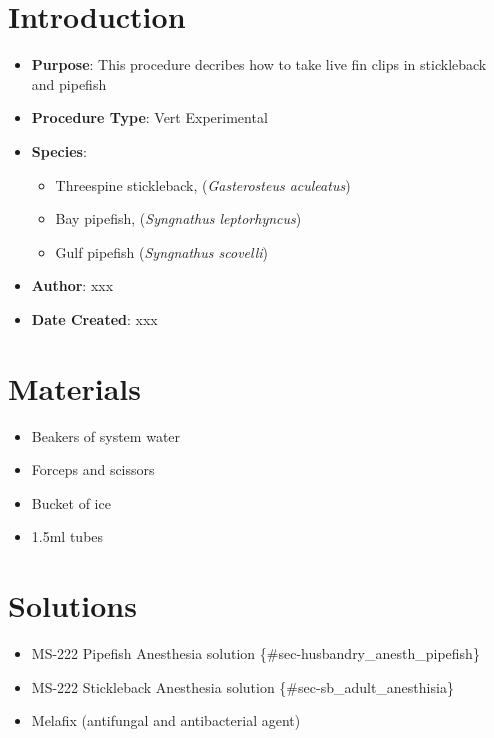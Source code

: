 \documentclass[
  letterpaper,
  DIV=11,
  numbers=noendperiod]{scrreprt}
\providecommand{\tightlist}{%
  \setlength{\itemsep}{0pt}\setlength{\parskip}{0pt}}\usepackage{longtable,booktabs,array}
\begin{document}
\hypertarget{introduction-56}{%
\section{Introduction}\label{introduction-56}}

\begin{itemize}
\tightlist
\item
  \textbf{Purpose}: This procedure decribes how to take live fin clips
  in stickleback and pipefish
\item
  \textbf{Procedure Type}: Vert Experimental
\item
  \textbf{Species}:

  \begin{itemize}
  \tightlist
  \item
    Threespine stickleback, (\emph{Gasterosteus aculeatus})
  \item
    Bay pipefish, (\emph{Syngnathus leptorhyncus})
  \item
    Gulf pipefish (\emph{Syngnathus scovelli})
  \end{itemize}
\item
  \textbf{Author}: xxx
\item
  \textbf{Date Created}: xxx
\end{itemize}

\hypertarget{materials-52}{%
\section{Materials}\label{materials-52}}

\begin{itemize}
\tightlist
\item
  Beakers of system water
\item
  Forceps and scissors
\item
  Bucket of ice
\item
  1.5ml tubes
\end{itemize}

\hypertarget{solutions-49}{%
\section{Solutions}\label{solutions-49}}

\begin{itemize}
\tightlist
\item
  MS-222 Pipefish Anesthesia solution
  \{\#sec-husbandry\_anesth\_pipefish\}
\item
  MS-222 Stickleback Anesthesia solution \{\#sec-sb\_adult\_anesthisia\}
\item
  Melafix (antifungal and antibacterial agent)
\end{itemize}
\end{document}
